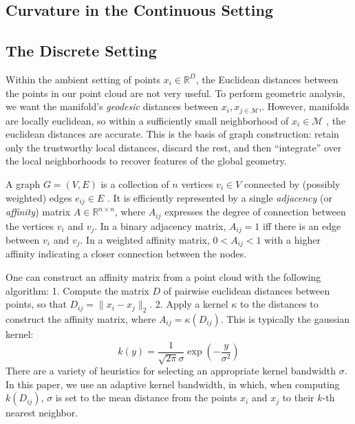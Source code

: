 \documentclass[
]{agujournal2019}
\begin{document}
\subsection{Curvature in the Continuous
Setting}\label{curvature-in-the-continuous-setting}

\subsection{The Discrete Setting}\label{the-discrete-setting}

Within the ambient setting of points \(x_{i} \in \mathbb{R}^D\), the
Euclidean distances between the points in our point cloud are not very
useful. To perform geometric analysis, we want the manifold's
\emph{geodesic} distances between \(x_{i}, x_{j \in \mathcal{M}}\),.
However, manifolds are locally euclidean, so within a sufficiently small
neighborhood of \(x_{i} \in \mathcal{M}\) , the euclidean distances are
accurate. This is the basis of graph construction: retain only the
trustworthy local distances, discard the rest, and then ``integrate''
over the local neighborhoods to recover features of the global geometry.

A graph \(G = (V, E)\) is a collection of \(n\) vertices \(v_{i} \in V\)
connected by (possibly weighted) edges \(e_{ij} \in E\) . It is
efficiently represented by a single \emph{adjacency} (or
\emph{affinity}) matrix \(A \in \mathbb{R}^{n \times n}\), where
\(A_{ij}\) expresses the degree of connection between the vertices
\(v_{i}\) and \(v_{j}\). In a binary adjacency matrix, \(A_{ij}=1\) iff
there is an edge between \(v_{i}\) and \(v_{j}\). In a weighted affinity
matrix, \(0<A_{ij}<1\) with a higher affinity indicating a closer
connection between the nodes.

One can construct an affinity matrix from a point cloud with the
following algorithm: 1. Compute the matrix \(D\) of pairwise euclidean
distances between points, so that \(D_{ij}=\|x_{i}-x_{j}\|_{2}\). 2.
Apply a kernel \(\kappa\) to the distances to construct the affinity
matrix, where \(A_{ij} = \kappa(D_{ij})\). This is typically the
gaussian kernel: \[
k(y) = \frac{1}{\sqrt{ 2\pi }\sigma}\exp\left( -\frac{y}{\sigma^2} \right)
\] There are a variety of heuristics for selecting an appropriate kernel
bandwidth \(\sigma\). In this paper, we use an adaptive kernel
bandwidth, in which, when computing \(k(D_{ij})\), \(\sigma\) is set to
the mean distance from the points \(x_{i}\) and \(x_{j}\) to their
\(k\)-th nearest neighbor.
\end{document}
